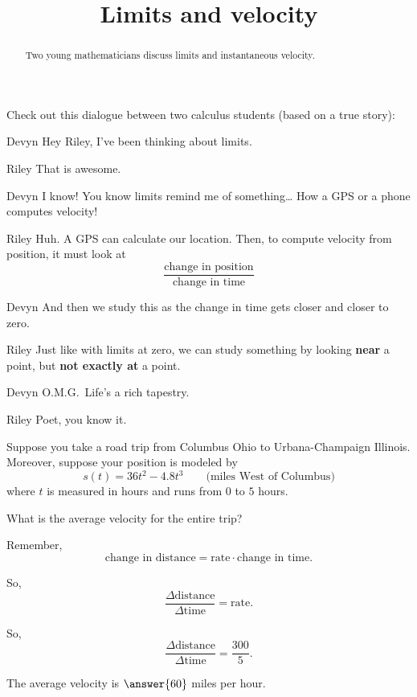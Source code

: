 \documentclass{ximera}
\title[Break-Ground:]{Limits and velocity}
\begin{document}
\begin{abstract}
Two young mathematicians discuss limits and instantaneous velocity.
\end{abstract}
\maketitle

Check out this dialogue between two calculus students (based on a true
story):

\begin{dialogue}
\item[Devyn] Hey Riley, I've been thinking about limits.
\item[Riley] That is awesome.
\item[Devyn] I know! You know limits remind me of something\dots
  How a GPS or a phone computes velocity!
\item[Riley] Huh.  A GPS can calculate our location.   Then, to compute velocity 
from position, it must look at
  \[
  \frac{\text{change in position}}{\text{change in time}}
  \]
\item[Devyn] And then we study this as the change in time gets closer
  and closer to zero.
\item[Riley] Just like with limits at zero, we can study something by
  looking \textbf{near} a point, but \textbf{not exactly at} a point.
\item[Devyn] O.M.G.\ Life's a rich tapestry.
\item[Riley] Poet, you know it.
\end{dialogue}



Suppose you take a road trip from Columbus Ohio to Urbana-Champaign
Illinois. Moreover, suppose your position is modeled by
\[
s(t) = 36t^2 -4.8t^3 \qquad\text{(miles West of Columbus)} %
\]
where $t$ is measured in hours and runs from $0$ to $5$ hours. 


\begin{problem}
  What is the average velocity for the entire trip?
  \begin{hint}
    Remember, 
    \[
    \text{change in distance} = \text{rate}\cdot\text{change in time}.
    \]
  \end{hint}
  \begin{hint}
    So, 
    \[
    \frac{\Delta\text{distance}}{\Delta\text{time}} = \text{rate}.
    \]
  \end{hint}
  \begin{hint}
    So, 
    \[
    \frac{\Delta\text{distance}}{\Delta\text{time}} = \frac{300}{5}.
    \]
  \end{hint}
  \begin{prompt}
    The average velocity is $\answer{60}$ miles per hour.
  \end{prompt}
\end{problem}
\end{document}
